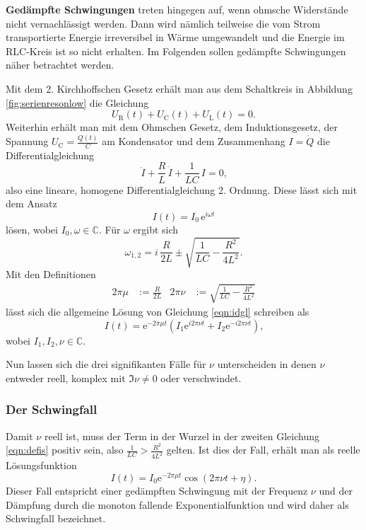 \textbf{Gedämpfte Schwingungen} treten hingegen auf, wenn ohmsche Widerstände nicht vernachlässigt werden. 
Dann wird nämlich teilweise die vom Strom transportierte Energie irreversibel in Wärme 
umgewandelt und die Energie im RLC-Kreis ist so nicht erhalten. Im Folgenden sollen gedämpfte 
Schwingungen näher betrachtet werden.

Mit dem 2. Kirchhoffschen Gesetz erhält man aus dem Schaltkreis in Abbildung \ref{fig:serienresonlow} die Gleichung
\begin{equation*}
	U_{\text{R}}(t) + U_{\text{C}}(t) + U_{\text{L}}(t) = 0 \text{.}
\end{equation*}
Weiterhin erhält man mit dem Ohmschen Gesetz, dem Induktionsgesetz, der Spannung $U_{\text{C}} = \frac{Q(t)}{C}$ am Kondensator und dem Zusammenhang $I = \dot{Q}$ die Differentialgleichung
\begin{equation}
	\ddot{I} + \frac{R}{L} \, \dot{I} + \frac{1}{LC} \, I = 0 \text{,}
	\label{eqn:idgl}
\end{equation}
also eine lineare, homogene Differentialgleichung 2. Ordnung.
Diese lässt sich mit dem Ansatz 
\begin{equation}
	I(t) = I_0 \, \mathrm{e}^{i \omega t}
\end{equation}
lösen, wobei $I_0, \omega \in \mathbb{C}$.
Für $\omega$ ergibt sich
\begin{equation}
	\omega_{1,2} = i \, \frac{R}{2L} \pm \sqrt{\frac{1}{LC} - \frac{R^2}{4L^2}} \text{.}
\end{equation}
Mit den Definitionen
\begin{align}
	2 \pi \mu &:= \frac{R}{2L} & 2 \pi \nu &:= \sqrt{\frac{1}{LC} - \frac{R^2}{4L^2}}
	\label{eqn:defis}
\end{align}
lässt sich die allgemeine Lösung von Gleichung \eqref{eqn:idgl} schreiben als
\begin{equation}
	I(t) = \mathrm{e}^{-2 \pi \mu t} (I_1 \mathrm{e}^{i 2 \pi \nu t} + I_2 \mathrm{e}^{-i 2 \pi \nu t}) \text{,}
\end{equation}
wobei $I_1, I_2, \nu \in \mathbb{C}$.

Nun lassen sich die drei signifikanten Fälle für $\nu$ unterscheiden in denen $\nu$ entweder reell, komplex mit $\Im \nu \neq 0$ oder verschwindet.

\subsubsection{Der Schwingfall}
Damit $\nu$ reell ist, muss der Term in der Wurzel in der zweiten Gleichung \eqref{eqn:defis} 
positiv sein, also $\frac{1}{LC} > \frac{R^2}{4L^2}$ gelten.
Ist dies der Fall, erhält man als reelle Lösungsfunktion
\begin{equation}
	I(t) = I_0 \mathrm{e}^{-2 \pi \mu t} \cos(2\pi \nu t + \eta) \text{.}
	\label{eqn:schwingi}
\end{equation}
Dieser Fall entspricht einer gedämpften Schwingung mit der Frequenz $\nu$ und der Dämpfung
durch die monoton fallende Exponentialfunktion und wird daher als Schwingfall bezeichnet.






